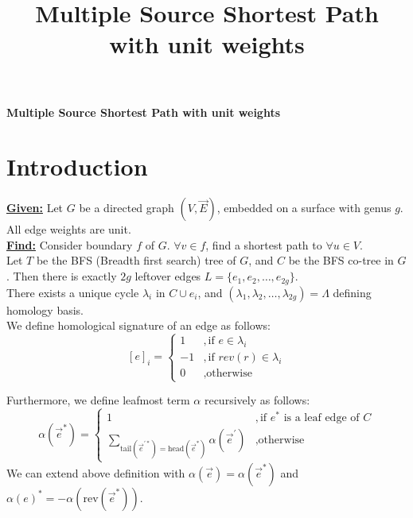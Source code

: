 \documentclass{article}
\begin{document}
\title{Multiple Source Shortest Path with unit weights}

\begin{center}
\textbf{\large Multiple Source Shortest Path with unit weights}
\end{center}

\section{Introduction}

\textbf{\underline{Given:}} Let $G$ be a directed graph $(V, \vec{E})$, embedded
on a surface with genus $g$. All edge weights are unit. \\
\textbf{\underline{Find:}} Consider boundary $f$ of $G$. $\forall v \in f$, find
a shortest path to $\forall u \in V$. \\

Let $T$ be the BFS (Breadth first search) tree of $G$, and $C$ be the BFS co-tree
in $G$. Then there is exactly $2g$ leftover edges $L = \{e_1, e_2, \ldots, e_{2g}\}$. \\

There exists a unique cycle $\lambda_i$ in $C \cup {e_i}$, and $(\lambda_1, 
\lambda_2, \ldots, \lambda_{2g}) = \Lambda$ defining homology basis. \\
We define homological signature of an edge as follows:
\[ [e]_{i} = \begin{cases} 1 & ,\mbox{if } e \in \lambda_i \\
                          -1 & ,\mbox{if } rev(r) \in \lambda_i \\
                           0 & ,\mbox{otherwise} \end{cases}\]

Furthermore, we define leafmost term $\alpha$ recursively as follows: \\
\[ \alpha(\vec{e}^*) = \begin{cases} 1 & ,\mbox{if } e^* \mbox{ is a leaf edge of } C \\
                           \sum \limits_{ \text{tail}(\vec{e}^{'*})
                           = \text{head}(\vec{e}^*) } \alpha(\vec{e}^{'}) & ,
                           \mbox{otherwise} \end{cases}\]
We can extend above definition with $\alpha(\vec{e}) = \alpha( \vec{e}^* )$ and 
  $\alpha(e)^* = - \alpha(\text{rev}(\vec{e}^*))$. \\
\end{document}
